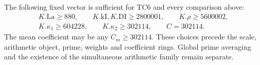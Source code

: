 The following fixed vector is sufficient for TC6 and every
comparison above:
\[
\begin{gathered}
 K.\mathrm{La}\ge880,\qquad
 K.\mathrm{kI},K.\mathrm{DI}\ge2800001,\qquad
 K.\rho\ge5600002,\\
 K.\kappa_1\ge604228,\qquad K.\kappa_2\ge302114,
 \qquad C=302114.
\end{gathered}                                                    \tag{GI.15}
\]
The mean coefficient may be any $C_m\ge302114$.
These choices precede the scale, arithmetic object, prime,
weights and coefficient rings. Global prime averaging and the
existence of the simultaneous arithmetic family remain separate.
